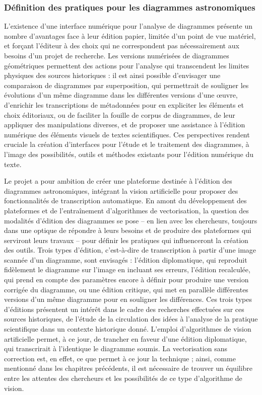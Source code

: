         \subsubsection{Définition des pratiques pour les diagrammes astronomiques}
        L'existence d'une interface numérique pour l'analyse de diagrammes présente un nombre d'avantages face à leur édition papier, limitée d'un point de vue matériel, et forçant l'éditeur à des choix qui ne correspondent pas nécessairement aux besoins d'un projet de recherche. Les versions numérisées de diagrammes géométriques permettent des actions pour l'analyse qui transcendent les limites physiques des sources historiques : il est ainsi possible d'envisager une comparaison de diagrammes par superposition, qui permettrait de souligner les évolutions d'un même diagramme dans les différentes versions d'une œuvre, d'enrichir les transcriptions de métadonnées pour en expliciter les éléments et choix éditoriaux, ou de faciliter la fouille de corpus de diagrammes, de leur appliquer des manipulations diverses, et de proposer une assistance à l'édition numérique des éléments visuels de textes scientifiques. Ces perspectives rendent cruciale la création d'interfaces pour l'étude et le traitement des diagrammes, à l'image des possibilités, outils et méthodes existants pour l'édition numérique du texte.
        
        Le projet \eida a pour ambition de créer une plateforme destinée à l'édition des diagrammes astronomiques, intégrant la vision artificielle pour proposer des fonctionnalités de transcription automatique. En amont du développement des plateformes et de l'entraînement d'algorithmes de vectorisation, la question des modalités d'édition des diagrammes se pose -- en lien avec les chercheurs, toujours dans une optique de répondre à leurs besoins et de produire des plateformes qui serviront leurs travaux -- pour définir les pratiques qui influenceront la création des outils. Trois types d'édition, c'est-à-dire de transcription à partir d'une image scannée d'un diagramme, sont envisagés : l'édition diplomatique, qui reproduit fidèlement le diagramme sur l'image en incluant ses erreurs, l'édition recalculée, qui prend en compte des paramètres encore à définir pour produire une version corrigée du diagramme, ou une édition critique, qui met en parallèle différentes versions d'un même diagramme pour en souligner les différences. Ces trois types d'éditions présentent un intérêt dans le cadre des recherches effectuées sur ces sources historiques, de l'étude de la circulation des idées à l'analyse de la pratique scientifique dans un contexte historique donné. L'emploi d'algorithmes de vision artificielle permet, à ce jour, de trancher en faveur d'une édition diplomatique, qui transcrirait à l'identique le diagramme soumis. La vectorisation sans correction est, en effet, ce que permet à ce jour la technique ; ainsi, comme mentionné dans les chapitres précédents, il est nécessaire de trouver un équilibre entre les attentes des chercheurs et les possibilités de ce type d'algorithme de vision.
